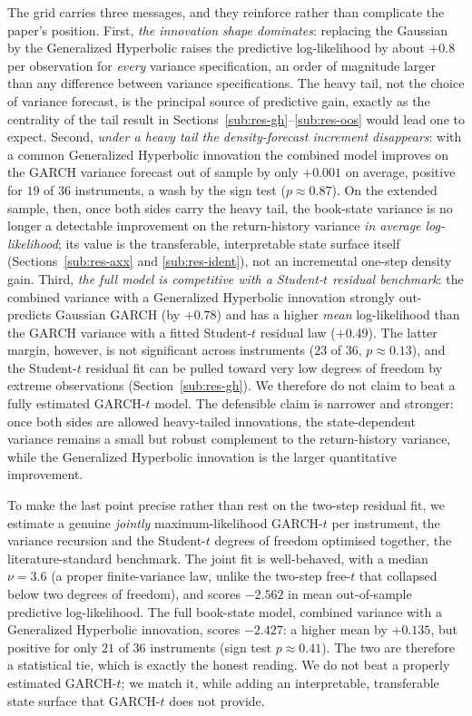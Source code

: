 \documentclass[11pt]{article}
\theoremstyle{plain}
\theoremstyle{definition}
\begin{document}
The grid carries three messages, and they reinforce rather than complicate the paper's
position. First, \emph{the innovation shape dominates}: replacing the Gaussian by the
Generalized Hyperbolic raises the predictive log-likelihood by about $+0.8$ per
observation for \emph{every} variance specification, an order of magnitude larger than
any difference between variance specifications. The heavy tail, not the choice of variance
forecast, is the principal source of predictive gain, exactly as the centrality of the
tail result in Sections~\ref{sub:res-gh}--\ref{sub:res-oos} would lead one to expect.
Second, \emph{under a heavy tail the density-forecast increment disappears}: with a common Generalized Hyperbolic innovation the combined model improves on the GARCH
variance forecast out of sample by only $+0.001$ on average, positive for $19$ of $36$
instruments, a wash by the sign test ($p\approx0.87$). On the extended sample, then, once both
sides carry the heavy tail, the book-state variance is no longer a detectable improvement on the
return-history variance \emph{in average log-likelihood}; its value is the transferable,
interpretable state surface itself (Sections~\ref{sub:res-axx} and \ref{sub:res-ident}), not an
incremental one-step density gain. Third, \emph{the full model is competitive
with a Student-$t$ residual benchmark}: the combined variance with a Generalized
Hyperbolic innovation strongly out-predicts Gaussian GARCH (by $+0.78$) and has a higher
\emph{mean} log-likelihood than the GARCH variance with a fitted Student-$t$ residual
law ($+0.49$). The latter margin, however, is not significant across instruments ($23$
of $36$, $p\approx0.13$), and the Student-$t$ residual fit can be pulled toward very low degrees of
freedom by extreme observations (Section~\ref{sub:res-gh}). We therefore do not claim
to beat a fully estimated GARCH-$t$ model. The defensible claim is narrower and stronger:
once both sides are allowed heavy-tailed innovations, the state-dependent variance
remains a small but robust complement to the return-history variance, while the
Generalized Hyperbolic innovation is the larger quantitative improvement.

To make the last point precise rather than rest on the two-step residual fit, we estimate a
genuine \emph{jointly} maximum-likelihood GARCH-$t$ per instrument, the variance recursion
and the Student-$t$ degrees of freedom optimised together, the literature-standard benchmark.
The joint fit is well-behaved, with a median $\nu=3.6$ (a proper finite-variance law, unlike
the two-step free-$t$ that collapsed below two degrees of freedom), and scores $-2.562$ in
mean out-of-sample predictive log-likelihood. The full book-state model, combined variance
with a Generalized Hyperbolic innovation, scores $-2.427$: a higher mean by $+0.135$, but
positive for only $21$ of $36$ instruments (sign test $p\approx0.41$). The two are therefore
a statistical tie, which is exactly the honest reading. We do not beat a properly estimated
GARCH-$t$; we match it, while adding an interpretable, transferable state surface that
GARCH-$t$ does not provide.
\end{document}
